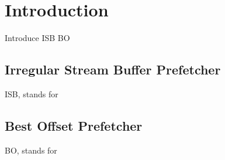 \section{Introduction}
\label{sec:intro}

Introduce ISB BO

  \subsection{Irregular Stream Buffer Prefetcher}
  \label{sec:isbintro}

  ISB, stands for

  \subsection{Best Offset Prefetcher}
  \label{sec:bointro}
  BO, stands for
